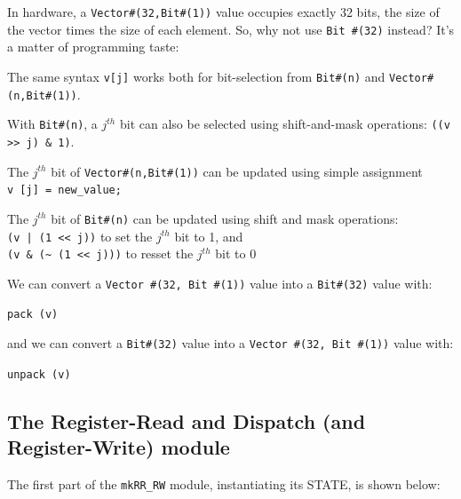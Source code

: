 
In hardware, a \verb|Vector#(32,Bit#(1))| value occupies exactly 32
bits, {\ie} the size of the vector times the size of each element.
So, why not use \verb|Bit #(32)| instead?  It's a matter of
programming taste:

\begin{tightlist}

  \item The same syntax \verb|v[j]| works both for bit-selection from
        \verb|Bit#(n)| and \verb|Vector#(n,Bit#(1))|.

  \item With \verb|Bit#(n)|, a $j^{th}$ bit can also be selected using
        shift-and-mask operations: \verb|((v >> j) & 1)|.

  \item The $j^{th}$ bit of \verb|Vector#(n,Bit#(1))| can be updated
        using simple assignment \\
	\hmm \verb|v [j] = new_value;|

  \item The $j^{th}$ bit of \verb|Bit#(n)| can be updated using shift
        and mask operations: \\
	\hmm \verb'(v | (1 << j))' to set the $j^{th}$ bit to 1, and \\
	\hmm \verb|(v & (~ (1 << j)))| to resset the $j^{th}$ bit to 0

\end{tightlist}

We can convert a \verb|Vector #(32, Bit #(1))| value into a \verb|Bit#(32)| value with:

\hmm \verb|pack (v)|

and we can convert a \verb|Bit#(32)| value into a \verb|Vector #(32, Bit #(1))| value with:

\hmm \verb|unpack (v)|


\subsection{The Register-Read and Dispatch (and Register-Write) module}

\label{Sec_mkRR_RW}

The first part of the \verb|mkRR_RW| module, instantiating its STATE, is shown below:

